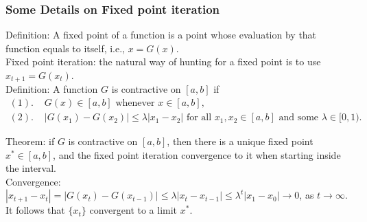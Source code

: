 





\begin{frame}
  \frametitle{Some Details on Fixed point iteration}
  Definition: A fixed point of a function is a point whose evaluation by that function equals to itself, i.e., $x=G(x)$.\\

  Fixed point iteration: the natural way of hunting for a fixed point is to use $x_{t+1}=G(x_t)$.\\

  Definition: A function $G$ is contractive on $[a,b]$ if
  \begin{align*}
    (1).\,\, & G(x)\in [a,b] \mbox{ whenever } x\in [a,b],\\
    (2).\,\, & |G(x_1) - G(x_2)| \leq \lambda |x_1-x_2| \mbox{ for all } x_1,x_2\in [a,b] \mbox{ and some } \lambda\in [0,1).
  \end{align*}

  Theorem: if $G$ is contractive on $[a,b]$, then there is a unique fixed point $x^*\in [a,b]$, and the fixed point iteration convergence to it when starting inside the interval. \\

  Convergence: $|x_{t+1}-x_{t}|=|G(x_t)-G(x_{t-1})|\leq \lambda |x_t - x_{t-1}|\leq \lambda^{t}|x_1-x_0| \rightarrow 0$, as $t\rightarrow \infty$. It follows that $\{x_t\}$ convergent to a limit $x^*$.\\



 \end{frame}

